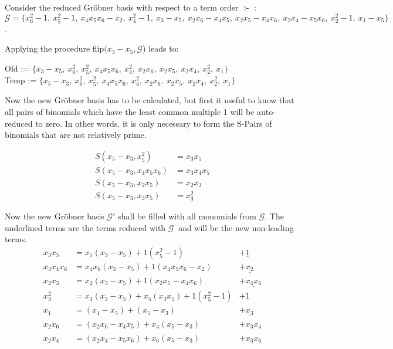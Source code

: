 \begin{env_example}\normalfont
Consider the reduced Gröbner basis with respect to a term order $\succ~$: $\mathcal{G}= \{x_{6}^{2}-1,~x_{5}^{2}-1,~x_{4}x_{5}x_{6} -x_{2},~x_{4}^{2}-1,~x_{3}-x_{5},~x_{2}x_{6}-x_{4}x_{5},~x_{2}x_{5}-x_{4}x_{6},~x_{2}x_{4}-x_{5}x_{6},~x_{2}^{2}-1,~x_{1}-x_{5}  \} $.

Applying the procedure flip$(x_{3}-x_{5}, \mathcal{G}$) leads to:

Old := $\{x_{3}-x_{5},~x_{6}^{2},~x_{5}^{2},~x_{4}x_{5}x_{6} ,~x_{4}^{2},~x_{2}x_{6},~x_{2}x_{5},~x_{2}x_{4},~x_{2}^{2},~x_{1} \} $ \\
Temp := $\{x_{5}-x_{3},~x_{6}^{2},~x_{5}^{2},~x_{4}x_{5}x_{6} ,~x_{4}^{2},~x_{2}x_{6},~x_{2}x_{5},~x_{2}x_{4},~x_{2}^{2},~x_{1} \} $

Now the new Gröbner basis has to be calculated, but first it useful to know that all pairs of binomials which have the least common multiple 1 will be auto-reduced to zero. In other words, it is only necessary to form the S-Pairs of binomials that are not relatively prime.

\begin{align*}
	S(x_{5}-x_{3},x_{5}^{2}) &= x_{3}x_{5} \\
	S(x_{5}-x_{3},x_{4}x_{5}x_{6}) &= x_{3}x_{4}x_{5} \\
	S(x_{5}-x_{3},x_{2}x_{5}) &= x_{2}x_{3} \\
	S(x_{5}-x_{3},x_{3}x_{5}) &= x_{3}^{2}
\end{align*}

Now the new Gröbner basis $\mathcal{G}'$ shall be filled with all monomials from $\mathcal{G}$.
The underlined terms are the terms reduced with $\mathcal{G}~$ and will be the new non-leading terms.
\begin{align*}
	x_{3}x_{5} &= x_{5}(x_{3}-x_{5}) + 1(x_{5}^{2}-1) &+ \underline{1} \\
	x_{3}x_{4}x_{6} &= x_{4}x_{6}(x_{3}-x_{5}) + 1(x_{4}x_{5}x_{6}-x_{2}) &+ \underline{x_{2}} \\
	x_{2}x_{3} &= x_{2}(x_{3}-x_{5}) + 1(x_{2}x_{5}- x_{4}x_{6}) &+ \underline{x_{4}x_{6}} \\
	x_{3}^{2} &= x_{3}(x_{3}-x_{5}) + x_{5}(x_{3}x_{5}) + 1(x_{5}^{2}-1)&+\underline{1} \\
	x_{1} &= (x_{1}-x_{5}) + (x_{5}-x_{3}) &+\underline{ x_{3}} \\
	x_{2}x_{6} &= (x_{2}x_{6}-x_{4}x_{5}) + x_{4}(x_{5}-x_{3}) &+\underline{ x_{3}x_{4}} \\
	x_{2}x_{4} &= (x_{2}x_{4}-x_{5}x_{6})+ x_{6}(x_{5}-x_{3}) &+\underline{x_{3}x_{6}}
\end{align*}


\end{env_example}

